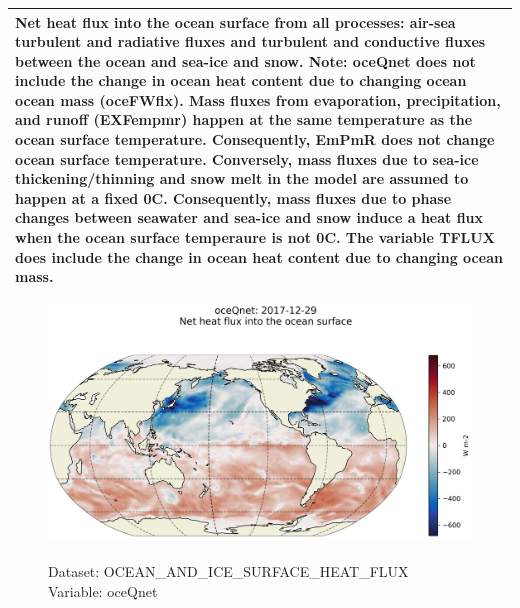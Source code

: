 \begin{longtable}{|p{}|p{}|p{}|p{}|}
\multicolumn{4}{|p{1\textwidth}|}{Net heat flux into the ocean surface from all processes: air-sea turbulent and radiative fluxes and turbulent and conductive fluxes between the ocean and sea-ice and snow. Note: oceQnet does not include the change in ocean heat content due to changing ocean ocean mass (oceFWflx). Mass fluxes from evaporation, precipitation, and runoff (EXFempmr) happen at the same temperature as the ocean surface temperature. Consequently, EmPmR does not change ocean surface temperature. Conversely, mass fluxes due to sea-ice thickening/thinning and snow melt in the model are assumed to happen at a fixed 0C. Consequently, mass fluxes due to phase changes between seawater and sea-ice and snow induce a heat flux when the ocean surface temperaure is not 0C. The variable TFLUX does include the change in ocean heat content due to changing ocean mass.} \\ \hline
\end{longtable}

\begin{figure}[H]
\centering
\includegraphics[scale=0.5]{../images/plots/latlon_plots/Ocean_and_Sea-Ice_Surface_Heat_Fluxes/oceQnet.png}
\caption{\\Dataset: OCEAN\_AND\_ICE\_SURFACE\_HEAT\_FLUX\\Variable: oceQnet}
\label{tab:table-OCEAN_AND_ICE_SURFACE_HEAT_FLUX_oceQnet-Plot}
\end{figure}
\pagebreak
